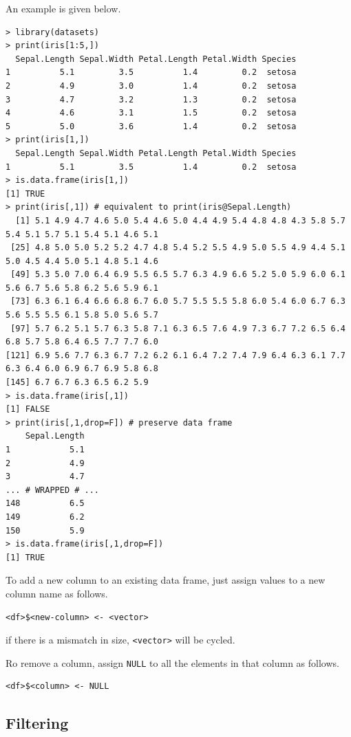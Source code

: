 An example is given below.
\begin{lstlisting}
> library(datasets)
> print(iris[1:5,])
  Sepal.Length Sepal.Width Petal.Length Petal.Width Species
1          5.1         3.5          1.4         0.2  setosa
2          4.9         3.0          1.4         0.2  setosa
3          4.7         3.2          1.3         0.2  setosa
4          4.6         3.1          1.5         0.2  setosa
5          5.0         3.6          1.4         0.2  setosa
> print(iris[1,])
  Sepal.Length Sepal.Width Petal.Length Petal.Width Species
1          5.1         3.5          1.4         0.2  setosa
> is.data.frame(iris[1,])
[1] TRUE
> print(iris[,1]) # equivalent to print(iris@Sepal.Length)
  [1] 5.1 4.9 4.7 4.6 5.0 5.4 4.6 5.0 4.4 4.9 5.4 4.8 4.8 4.3 5.8 5.7 5.4 5.1 5.7 5.1 5.4 5.1 4.6 5.1
 [25] 4.8 5.0 5.0 5.2 5.2 4.7 4.8 5.4 5.2 5.5 4.9 5.0 5.5 4.9 4.4 5.1 5.0 4.5 4.4 5.0 5.1 4.8 5.1 4.6
 [49] 5.3 5.0 7.0 6.4 6.9 5.5 6.5 5.7 6.3 4.9 6.6 5.2 5.0 5.9 6.0 6.1 5.6 6.7 5.6 5.8 6.2 5.6 5.9 6.1
 [73] 6.3 6.1 6.4 6.6 6.8 6.7 6.0 5.7 5.5 5.5 5.8 6.0 5.4 6.0 6.7 6.3 5.6 5.5 5.5 6.1 5.8 5.0 5.6 5.7
 [97] 5.7 6.2 5.1 5.7 6.3 5.8 7.1 6.3 6.5 7.6 4.9 7.3 6.7 7.2 6.5 6.4 6.8 5.7 5.8 6.4 6.5 7.7 7.7 6.0
[121] 6.9 5.6 7.7 6.3 6.7 7.2 6.2 6.1 6.4 7.2 7.4 7.9 6.4 6.3 6.1 7.7 6.3 6.4 6.0 6.9 6.7 6.9 5.8 6.8
[145] 6.7 6.7 6.3 6.5 6.2 5.9
> is.data.frame(iris[,1])
[1] FALSE
> print(iris[,1,drop=F]) # preserve data frame
    Sepal.Length
1            5.1
2            4.9
3            4.7
... # WRAPPED # ...
148          6.5
149          6.2
150          5.9
> is.data.frame(iris[,1,drop=F])
[1] TRUE
\end{lstlisting}

To add a new column to an existing data frame, just assign values to a new column name as follows.
\begin{lstlisting}
<df>$<new-column> <- <vector>
\end{lstlisting}
if there is a mismatch in size, \verb|<vector>| will be cycled.

Ro remove a column, assign \verb|NULL| to all the elements in that column as follows.
\begin{lstlisting}
<df>$<column> <- NULL
\end{lstlisting}

\subsection{Filtering}

